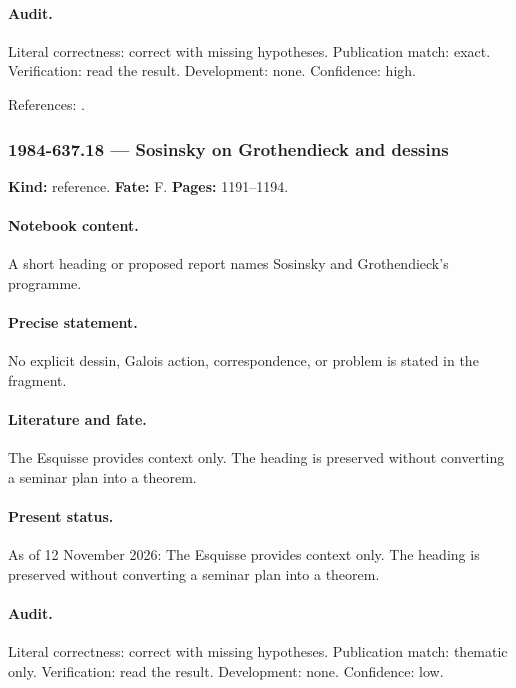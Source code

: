 \paragraph{Audit.} Literal correctness: correct with missing hypotheses. Publication match: exact. Verification: read the result. Development: none. Confidence: high.

\noindent References: \citep{semenov1985dressing}.\par

\subsubsection{1984-637.18 --- Sosinsky on Grothendieck and dessins}

\label{item:1984-637.18}

\noindent\textbf{Kind:} reference. \textbf{Fate:} F. \textbf{Pages:} 1191--1194.\par

\paragraph{Notebook content.} A short heading or proposed report names Sosinsky and Grothendieck's programme.

\paragraph{Precise statement.} No explicit dessin, Galois action, correspondence, or problem is stated in the fragment.

\paragraph{Literature and fate.} The Esquisse provides context only. The heading is preserved without converting a seminar plan into a theorem.

\paragraph{Present status.} As of 12 November 2026: The Esquisse provides context only. The heading is preserved without converting a seminar plan into a theorem.

\paragraph{Audit.} Literal correctness: correct with missing hypotheses. Publication match: thematic only. Verification: read the result. Development: none. Confidence: low.

